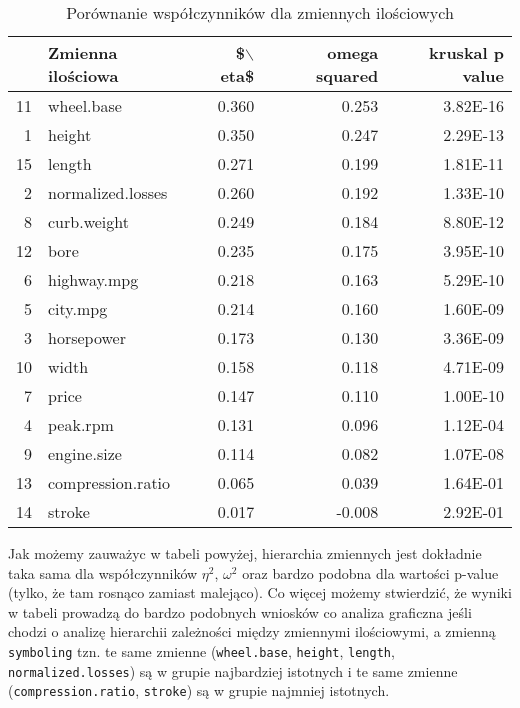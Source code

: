 \documentclass[12pt, a4paper]{article}\usepackage[]{graphicx}\usepackage[]{xcolor}
\begin{document}
\begin{table}[H]
\centering
\begin{tabular}{rlrrr}
  \hline
 & Zmienna ilościowa & \$$\backslash$eta\$ & omega squared & kruskal p value \\ 
  \hline
11 & wheel.base & 0.360 & 0.253 & 3.82E-16 \\ 
  1 & height & 0.350 & 0.247 & 2.29E-13 \\ 
  15 & length & 0.271 & 0.199 & 1.81E-11 \\ 
  2 & normalized.losses & 0.260 & 0.192 & 1.33E-10 \\ 
  8 & curb.weight & 0.249 & 0.184 & 8.80E-12 \\ 
  12 & bore & 0.235 & 0.175 & 3.95E-10 \\ 
  6 & highway.mpg & 0.218 & 0.163 & 5.29E-10 \\ 
  5 & city.mpg & 0.214 & 0.160 & 1.60E-09 \\ 
  3 & horsepower & 0.173 & 0.130 & 3.36E-09 \\ 
  10 & width & 0.158 & 0.118 & 4.71E-09 \\ 
  7 & price & 0.147 & 0.110 & 1.00E-10 \\ 
  4 & peak.rpm & 0.131 & 0.096 & 1.12E-04 \\ 
  9 & engine.size & 0.114 & 0.082 & 1.07E-08 \\ 
  13 & compression.ratio & 0.065 & 0.039 & 1.64E-01 \\ 
  14 & stroke & 0.017 & -0.008 & 2.92E-01 \\ 
   \hline
\end{tabular}
\caption{Porównanie współczynników dla zmiennych ilościowych} 
\label{tab:num_cors}
\end{table}


Jak możemy zauważyc w tabeli powyżej, hierarchia zmiennych jest dokładnie taka sama dla współczynników $\eta^2$, $\omega^2$ oraz bardzo podobna dla wartości p-value (tylko, że tam rosnąco zamiast malejąco). Co więcej możemy stwierdzić, że wyniki w tabeli prowadzą do bardzo podobnych wniosków co analiza graficzna jeśli chodzi o analizę hierarchii zależności między zmiennymi ilościowymi, a zmienną \texttt{symboling} tzn. te same zmienne (\texttt{wheel.base}, \texttt{height}, \texttt{length}, \texttt{normalized.losses}) są w grupie najbardziej istotnych i te same zmienne (\texttt{compression.ratio}, \texttt{stroke}) są w grupie najmniej istotnych. 
\end{document}
